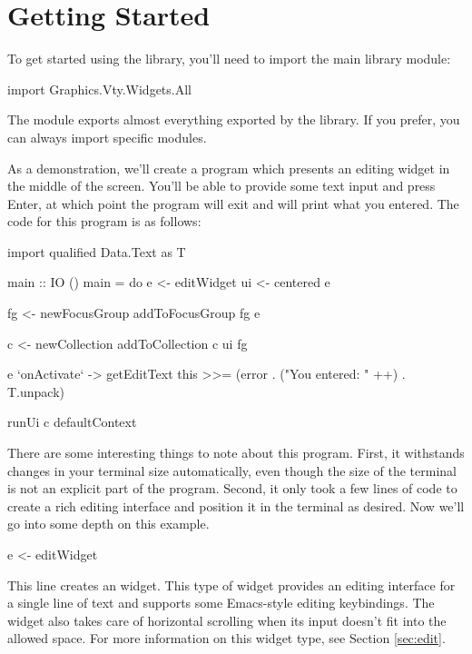 \section{Getting Started}
\label{sec:gettingStarted}

To get started using the library, you'll need to import the main library
module:

\begin{haskellcode}
 import Graphics.Vty.Widgets.All
\end{haskellcode}

The  module exports almost everything exported by the library.
If you prefer, you can always import specific modules.

As a demonstration, we'll create a program which presents an editing
widget in the middle of the screen.  You'll be able to provide some
text input and press Enter, at which point the program will exit and
will print what you entered.  The code for this program is as follows:

\begin{haskellcode}
 import qualified Data.Text as T

 main :: IO ()
 main = do
   e <- editWidget
   ui <- centered e

   fg <- newFocusGroup
   addToFocusGroup fg e

   c <- newCollection
   addToCollection c ui fg

   e `onActivate` \this ->
     getEditText this >>= (error . ("You entered: " ++) . T.unpack)

   runUi c defaultContext
\end{haskellcode}

There are some interesting things to note about this program.  First,
it withstands changes in your terminal size automatically, even though
the size of the terminal is not an explicit part of the program.
Second, it only took a few lines of code to create a rich editing
interface and position it in the terminal as desired.  Now we'll go
into some depth on this example.

\begin{haskellcode}
 e <- editWidget
\end{haskellcode}

This line creates an  widget.  This type of widget provides
an editing interface for a single line of text and supports some
Emacs-style editing keybindings.  The  widget also takes care
of horizontal scrolling when its input doesn't fit into the allowed
space.  For more information on this widget type, see Section
\ref{sec:edit}.

